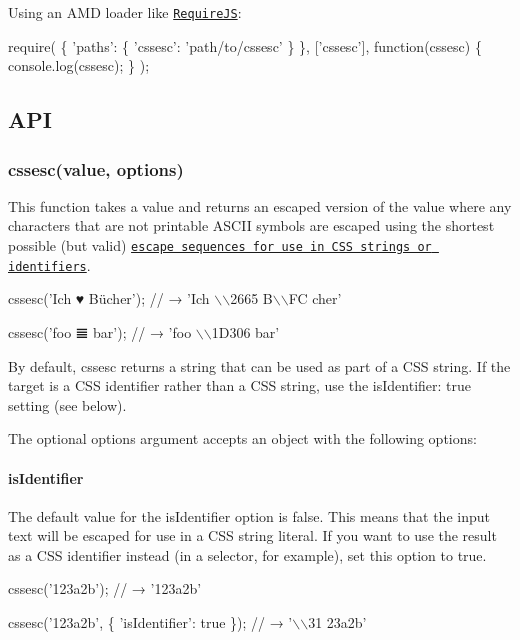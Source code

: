 Using an A\+MD loader like \href{http://requirejs.org/}{\tt Require\+JS}\+:


\begin{DoxyCode}
require(
  \{
    'paths': \{
      'cssesc': 'path/to/cssesc'
    \}
  \},
  ['cssesc'],
  function(cssesc) \{
    console.log(cssesc);
  \}
);
\end{DoxyCode}


\subsection*{A\+PI}

\subsubsection*{{\ttfamily cssesc(value, options)}}

This function takes a value and returns an escaped version of the value where any characters that are not printable A\+S\+C\+II symbols are escaped using the shortest possible (but valid) \href{http://mathiasbynens.be/notes/css-escapes}{\tt escape sequences for use in C\+SS strings or identifiers}.


\begin{DoxyCode}
cssesc('Ich ♥ Bücher');
// → 'Ich \(\backslash\)\(\backslash\)2665  B\(\backslash\)\(\backslash\)FC cher'

cssesc('foo 𝌆 bar');
// → 'foo \(\backslash\)\(\backslash\)1D306  bar'
\end{DoxyCode}


By default, {\ttfamily cssesc} returns a string that can be used as part of a C\+SS string. If the target is a C\+SS identifier rather than a C\+SS string, use the {\ttfamily is\+Identifier\+: true} setting (see below).

The optional {\ttfamily options} argument accepts an object with the following options\+:

\paragraph*{{\ttfamily is\+Identifier}}

The default value for the {\ttfamily is\+Identifier} option is {\ttfamily false}. This means that the input text will be escaped for use in a C\+SS string literal. If you want to use the result as a C\+SS identifier instead (in a selector, for example), set this option to {\ttfamily true}.


\begin{DoxyCode}
cssesc('123a2b');
// → '123a2b'

cssesc('123a2b', \{
  'isIdentifier': true
\});
// → '\(\backslash\)\(\backslash\)31 23a2b'
\end{DoxyCode}



